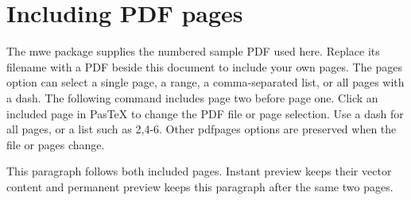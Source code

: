 \documentclass[a4paper]{article}
\begin{document}
\section{Including PDF pages}
The mwe package supplies the numbered sample PDF used here. Replace its filename
with a PDF beside this document to include your own pages. The pages option can
select a single page, a range, a comma-separated list, or all pages with a dash.
The following command includes page two before page one.
Click an included page in PasTeX to change the PDF file or page selection.
Use a dash for all pages, or a list such as 2,4-6. Other pdfpages options are
preserved when the file or pages change.



This paragraph follows both included pages. Instant preview keeps their vector
content and permanent preview keeps this paragraph after the same two pages.
\end{document}
